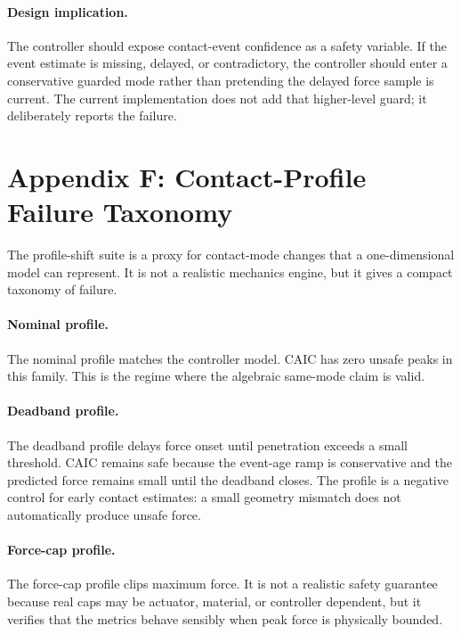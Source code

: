 \documentclass{article}
\newcommand{\caic}{CAIC}
\begin{document}
\paragraph{Design implication.}
The controller should expose contact-event confidence as a safety variable. If the event estimate is missing, delayed, or contradictory, the controller should enter a conservative guarded mode rather than pretending the delayed force sample is current. The current implementation does not add that higher-level guard; it deliberately reports the failure.

\section{Appendix F: Contact-Profile Failure Taxonomy}

The profile-shift suite is a proxy for contact-mode changes that a one-dimensional model can represent. It is not a realistic mechanics engine, but it gives a compact taxonomy of failure.

\begin{table}[t]
    \centering
    \scriptsize
    \caption{Profile-family breakdown for the mode/profile suite. Unsafe is peak force above 12 N. CAIC p95 and max are peak force in Newtons.}
    \label{tab:mode-profile}
    \resizebox{\linewidth}{!}{}
\end{table}

\paragraph{Nominal profile.}
The nominal profile matches the controller model. \caic{} has zero unsafe peaks in this family. This is the regime where the algebraic same-mode claim is valid.

\paragraph{Deadband profile.}
The deadband profile delays force onset until penetration exceeds a small threshold. \caic{} remains safe because the event-age ramp is conservative and the predicted force remains small until the deadband closes. The profile is a negative control for early contact estimates: a small geometry mismatch does not automatically produce unsafe force.

\paragraph{Force-cap profile.}
The force-cap profile clips maximum force. It is not a realistic safety guarantee because real caps may be actuator, material, or controller dependent, but it verifies that the metrics behave sensibly when peak force is physically bounded.
\end{document}
